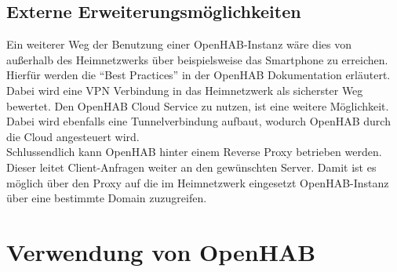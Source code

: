 \subsection{Externe Erweiterungsmöglichkeiten}
Ein weiterer Weg der Benutzung einer OpenHAB-Instanz wäre dies von außerhalb des Heimnetzwerks über beispielsweise das Smartphone zu erreichen. Hierfür werden die "`Best Practices"' in der OpenHAB Dokumentation erläutert.\\
Dabei wird eine VPN Verbindung in das Heimnetzwerk als sicherster Weg bewertet. Den OpenHAB Cloud Service zu nutzen, ist eine weitere Möglichkeit. Dabei wird ebenfalls eine Tunnelverbindung aufbaut, wodurch OpenHAB durch die Cloud angesteuert wird.\\
Schlussendlich kann OpenHAB hinter einem Reverse Proxy betrieben werden. Dieser leitet Client-Anfragen weiter an den gewünschten Server. Damit ist es möglich über den Proxy auf die im Heimnetzwerk eingesetzt OpenHAB-Instanz über eine bestimmte Domain zuzugreifen.

\section{Verwendung von OpenHAB}
